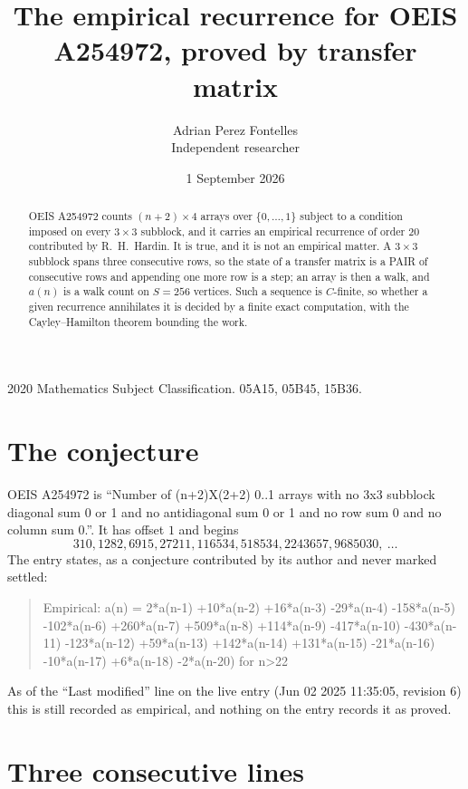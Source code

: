 \documentclass[11pt,a4paper]{article}
\title{The empirical recurrence for OEIS A254972, proved by transfer matrix}
\author{Adrian Perez Fontelles\\ \small Independent researcher}
\date{1 September 2026}
\theoremstyle{plain}
\theoremstyle{definition}
\begin{document}
\maketitle

\begin{abstract}
OEIS A254972 counts $(n+2)\times4$ arrays over $\{0,\dots,1\}$ subject to a condition imposed on
every $3\times3$ subblock, and it carries an empirical recurrence of order $20$
contributed by R.~H.~Hardin. It is true, and it is not an empirical matter. A $3\times3$
subblock spans three consecutive rows, so the state of a transfer matrix is a PAIR of
consecutive rows and appending one more row is a step; an array is then a walk, and
$a(n)$ is a walk count on $S=256$ vertices. Such a sequence is $C$-finite, so whether a given
recurrence annihilates it is decided by a finite exact computation, with the Cayley--Hamilton
theorem bounding the work.
\end{abstract}

\noindent\small 2020 Mathematics Subject Classification. 05A15, 05B45, 15B36.\normalsize

\section{The conjecture}

OEIS A254972 is ``Number of (n+2)X(2+2) 0..1 arrays with no 3x3 subblock diagonal sum 0 or 1 and no antidiagonal sum 0 or 1 and no row sum 0 and no column sum 0.''. It has offset $1$ and begins
\[
310, 1282, 6915, 27211, 116534, 518534, 2243657, 9685030,\ \dots
\]
The entry states, as a conjecture contributed by its author and never marked settled:
\begin{quote}
Empirical: a(n) = 2*a(n-1) +10*a(n-2) +16*a(n-3) -29*a(n-4) -158*a(n-5) -102*a(n-6) +260*a(n-7) +509*a(n-8) +114*a(n-9) -417*a(n-10) -430*a(n-11) -123*a(n-12) +59*a(n-13) +142*a(n-14) +131*a(n-15) -21*a(n-16) -10*a(n-17) +6*a(n-18) -2*a(n-20) for n>22
\end{quote}
As of the ``Last modified'' line on the live entry (Jun 02 2025 11:35:05, revision 6) this is still
recorded as empirical, and nothing on the entry records it as proved.

\section{Three consecutive lines}
\end{document}

